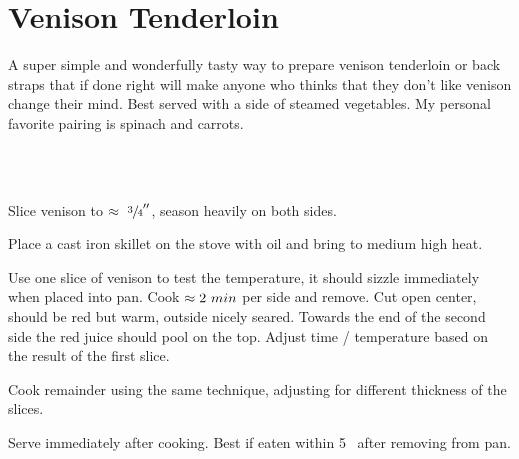 \section{Venison Tenderloin}

\begin{recipestats}[
        servings=2,
        preptime=5 \minute,
        bakingtime=$[10 \ldots 15]~\minute$,
        source=David Henry,
    ]
\end{recipestats}

\begin{recipeabstract}
    A super simple and wonderfully tasty way to prepare venison tenderloin or back straps that if done right
    will make anyone who thinks that they don't like venison change their mind.
    Best served with a side of steamed vegetables.
    My personal favorite pairing is spinach and carrots.
\end{recipeabstract}

\begin{ingredientcolumns}[1]
    \begin{ingredientblock}
        \\
        \\
    \end{ingredientblock}
\end{ingredientcolumns}

\begin{preparation}
\item Slice venison to $\approx~\sfrac{3}{4}''$, season heavily on both sides.

\item Place a cast iron skillet on the stove with oil and bring to medium high heat.

\item Use one slice of venison to test the temperature, it should sizzle immediately when placed into pan.
    Cook $~\minute$ per side and remove.
    Cut open center, should be red but warm, outside nicely seared.
    Towards the end of the second side the red juice should pool on the top.
    Adjust time / temperature based on the result of the first slice.

\item Cook remainder using the same technique, adjusting for different thickness of the slices.

\item Serve immediately after cooking.
    Best if eaten within 5 \minute~after removing from pan.
\end{preparation}

\recipeend%
